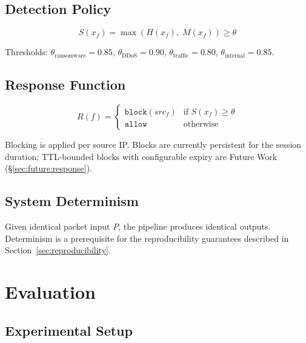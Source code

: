 \documentclass[11pt,a4paper]{article}
\begin{document}
\subsection{Detection Policy}

\begin{equation}
  S(x_f) = \max\!\left(H(x_f),\; M(x_f)\right) \geq \theta
\end{equation}

Thresholds: $\theta_{\text{ransomware}} = 0.85$, $\theta_{\text{DDoS}} = 0.90$,
$\theta_{\text{traffic}} = 0.80$, $\theta_{\text{internal}} = 0.85$.

\subsection{Response Function}

\begin{equation}
  R(f) = \begin{cases}
    \texttt{block}(src_f) & \text{if } S(x_f) \geq \theta \\
    \texttt{allow}        & \text{otherwise}
  \end{cases}
\end{equation}

Blocking is applied per source IP. Blocks are currently persistent for the session duration;
TTL-bounded blocks with configurable expiry are Future Work (\S\ref{sec:future:response}).

\subsection{System Determinism}

Given identical packet input $P$, the pipeline produces identical outputs. Determinism is a
prerequisite for the reproducibility guarantees described in Section~\ref{sec:reproducibility}.

\section{Evaluation}
\label{sec:eval}

\subsection{Experimental Setup}
\end{document}
